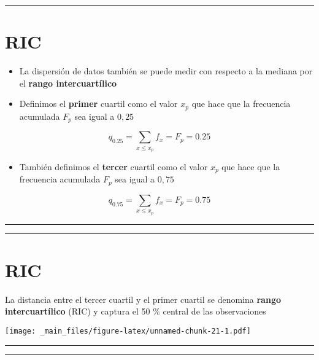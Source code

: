 \documentclass[
]{book}
\providecommand{\tightlist}{%
  \setlength{\itemsep}{0pt}\setlength{\parskip}{0pt}}
\begin{document}
\begin{center}\rule{0.5\linewidth}{0.5pt}\end{center}

\hypertarget{ric}{%
\section{RIC}\label{ric}}

\begin{itemize}
\item
  La dispersión de datos también se puede medir con respecto a la mediana por el \textbf{rango intercuartílico}
\item
  Definimos el \textbf{primer} cuartil como el valor \(x_p\) que hace que la frecuencia acumulada \(F_p\) sea igual a \(0,25\)
\end{itemize}

\[q_{0.25}=\sum_{x\leq x_p} f_x =F_p=0.25\]

\begin{itemize}
\tightlist
\item
  También definimos el \textbf{tercer} cuartil como el valor \(x_p\) que hace que la frecuencia acumulada \(F_p\) sea igual a \(0,75\)
\end{itemize}

\[q_{0.75}=\sum_{x\leq x_p} f_x =F_p=0.75\]

\begin{center}\rule{0.5\linewidth}{0.5pt}\end{center}

\begin{center}\rule{0.5\linewidth}{0.5pt}\end{center}

\hypertarget{ric-1}{%
\section{RIC}\label{ric-1}}

La distancia entre el tercer cuartil y el primer cuartil se denomina \textbf{rango intercuartílico} (RIC) y captura el 50 \% central de las observaciones

\texttt{[image: \_main\_files/figure-latex/unnamed-chunk-21-1.pdf]}

\begin{center}\rule{0.5\linewidth}{0.5pt}\end{center}

\begin{center}\rule{0.5\linewidth}{0.5pt}\end{center}
\end{document}
